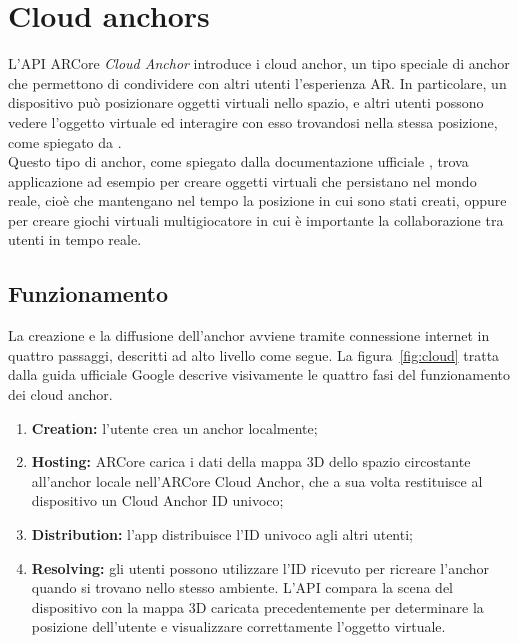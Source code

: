 \documentclass[crop=false, class=book]{standalone}
\newcommand\litem[1]{\item{\bfseries #1:}}
\begin{document}
	\chapter{Cloud anchors}
	L'API ARCore \textit{Cloud Anchor} introduce i cloud anchor, un tipo speciale di anchor che permettono di condividere con altri utenti l'esperienza AR. In particolare, un dispositivo può posizionare oggetti virtuali nello spazio, e altri utenti possono vedere l'oggetto virtuale ed interagire con esso trovandosi nella stessa posizione, come spiegato da \cite{kert2021mobile}.
	\\
	Questo tipo di anchor, come spiegato dalla documentazione ufficiale \cite{google2022cloud}, trova applicazione ad esempio per creare oggetti virtuali che persistano nel mondo reale, cioè che mantengano nel tempo la posizione in cui sono stati creati, oppure per creare giochi virtuali multigiocatore in cui è importante la collaborazione tra utenti in tempo reale.
	
	\section{Funzionamento}
	La creazione e la diffusione dell'anchor avviene tramite connessione internet in quattro passaggi, descritti ad alto livello come segue. La figura~\vref{fig:cloud} tratta dalla guida ufficiale Google descrive visivamente le quattro fasi del funzionamento dei cloud anchor.
	\begin{enumerate}
		\litem{Creation} l'utente crea un anchor localmente;
		\litem{Hosting} ARCore carica i dati della mappa 3D dello spazio circostante all'anchor locale nell'ARCore Cloud Anchor, che a sua volta restituisce al dispositivo un Cloud Anchor ID univoco;
		\litem{Distribution} l'app distribuisce l'ID univoco agli altri utenti;
		\litem{Resolving} gli utenti possono utilizzare l'ID ricevuto per ricreare l'anchor quando si trovano nello stesso ambiente. L'API compara la scena del dispositivo con la mappa 3D caricata precedentemente per determinare la posizione dell'utente e visualizzare correttamente l'oggetto virtuale.
	\end{enumerate}
	
\end{document}

